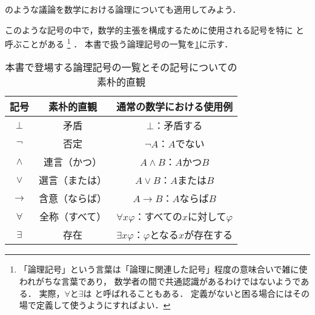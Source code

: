 のような議論を数学における論理についても適用してみよう．


このような記号の中で，数学的主張を構成するために使用される記号を特に%
%
と呼ぶことがある%
\footnote{%
	「論理記号」という言葉は「論理に関連した記号」程度の意味合いで雑に使われがちな言葉であり，
	数学者の間で共通認識があるわけではないようである．
	実際，\(\forall\)と\(\exists\)は%
	と呼ばれることもある．
	定義がないと困る場合にはその場で定義して使うようにすればよい．
}%
．
本書で扱う論理記号の一覧を\cref{tab:logicalsymbol}に示す．

\begin{table}[htbp]
	\centering
	\caption{本書で登場する論理記号の一覧とその記号についての素朴的直観}
	\label{tab:logicalsymbol}
	\begin{tabular}{ccc}
		\toprule
		記号          & 素朴的直観   & 通常の数学における使用例                                   \\
		\midrule
		\(\bot\)    & 矛盾      & \(\bot\)：矛盾する                                  \\
		\(\lnot\)   & 否定      & \(\lnot A\)：\(A\)でない                           \\
		\(\land\)   & 連言（かつ）  & \(A \land B\)：\(A\)かつ\(B\)                     \\
		\(\lor\)    & 選言（または） & \(A \lor B\)：\(A\)または\(B\)                     \\
		\(\to\)     & 含意（ならば） & \(A \to B\)：\(A\)ならば\(B\)                      \\
		\(\forall\) & 全称（すべて） & \(\forall x \varphi\)：すべての\(x\)に対して\(\varphi\) \\
		\(\exists\) & 存在      & \(\exists x \varphi\)：\(\varphi\)となる\(x\)が存在する \\
		\bottomrule
	\end{tabular}
\end{table}


